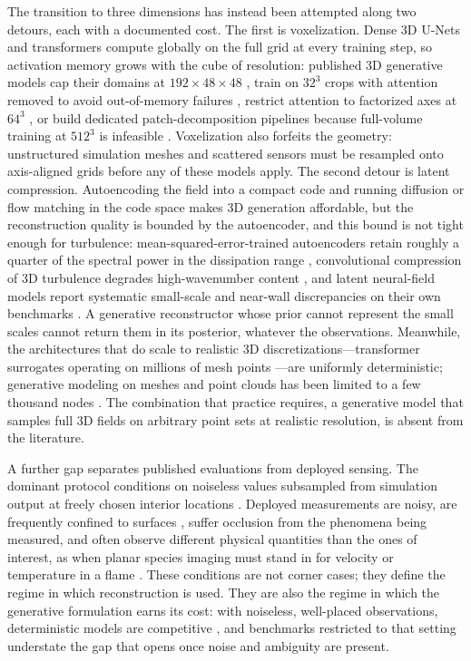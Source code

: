 \documentclass{article} %
\begin{document}
The transition to three dimensions has instead been attempted along two detours, each with a documented cost. The first is voxelization. Dense 3D U-Nets and transformers compute globally on the full grid at every training step, so activation memory grows with the cube of resolution: published 3D generative models cap their domains at $192\times48\times48$ \citep{lienen2024zero}, train on $32^3$ crops with attention removed to avoid out-of-memory failures \citep{oommen2026turbulent}, restrict attention to factorized axes at $64^3$ \citep{li2023factformer}, or build dedicated patch-decomposition pipelines because full-volume training at $512^3$ is infeasible \citep{holzschuh2026pd3}. Voxelization also forfeits the geometry: unstructured simulation meshes and scattered sensors must be resampled onto axis-aligned grids before any of these models apply. The second detour is latent compression. Autoencoding the field into a compact code and running diffusion or flow matching in the code space \citep{du2024confild,zhou2025text2pde,wang2026fundiff,li2025latent} makes 3D generation affordable, but the reconstruction quality is bounded by the autoencoder, and this bound is not tight enough for turbulence: mean-squared-error-trained autoencoders retain roughly a quarter of the spectral power in the dissipation range \citep{rafiq2026spectrally}, convolutional compression of 3D turbulence degrades high-wavenumber content \citep{glaws2020deep}, and latent neural-field models report systematic small-scale and near-wall discrepancies on their own benchmarks \citep{du2024confild}. A generative reconstructor whose prior cannot represent the small scales cannot return them in its posterior, whatever the observations. Meanwhile, the architectures that do scale to realistic 3D discretizations---transformer surrogates operating on millions of mesh points \citep{luo2025transolver,alkin2024upt,alkin2025abupt,li2023gino}---are uniformly deterministic; generative modeling on meshes and point clouds has been limited to a few thousand nodes \citep{lino2025dgn}. The combination that practice requires, a generative model that samples full 3D fields on arbitrary point sets at realistic resolution, is absent from the literature.

A further gap separates published evaluations from deployed sensing. The dominant protocol conditions on noiseless values subsampled from simulation output at freely chosen interior locations \citep{shu2023physics,huang2024diffusionpde,amoros2026guiding}. Deployed measurements are noisy, are frequently confined to surfaces \citep{guastoni2021convolutional,cuellar2024three,mousavi2025low}, suffer occlusion from the phenomena being measured, and often observe different physical quantities than the ones of interest, as when planar species imaging must stand in for velocity or temperature in a flame \citep{barwey2021extracting,kildare2024deep}. These conditions are not corner cases; they define the regime in which reconstruction is used. They are also the regime in which the generative formulation earns its cost: with noiseless, well-placed observations, deterministic models are competitive \citep{zhuang2025spatially}, and benchmarks restricted to that setting understate the gap that opens once noise and ambiguity are present.
\end{document}
